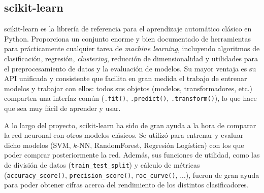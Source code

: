 \subsection{scikit-learn}


scikit-learn es la librería de referencia para el aprendizaje automático clásico en Python. Proporciona un conjunto enorme y bien documentado de herramientas para prácticamente cualquier tarea de \textit{machine learning}, incluyendo algoritmos de clasificación, regresión, \textit{clustering}, reducción de dimensionalidad y utilidades para el preprocesamiento de datos y la evaluación de modelos. Su mayor ventaja es su API unificada y consistente que facilita en gran medida el trabajo de entrenar modelos y trabajar con ellos: todos sus objetos (modelos, transformadores, etc.) comparten una interfaz común (\texttt{.fit()}, \texttt{.predict()}, \texttt{.transform()}), lo que hace que sea muy fácil de aprender y usar.

A lo largo del proyecto, scikit-learn ha sido de gran ayuda a la hora de comparar la red neuronal con otros modelos clásicos. Se utilizó para entrenar y evaluar dicho modelos (SVM, $k$-NN, RandomForest, Regresión Logística) con los que poder comprar posteriormente la red. Además, sus funciones de utilidad, como las de división de datos (\texttt{train\_test\_split}) y cálculo de métricas (\texttt{accuracy\_score()}, \texttt{precision\_score()}, \texttt{roc\_curve()}, ...), fueron de gran ayuda para poder obtener cifras acerca del rendimiento de los distintos clasificadores.

